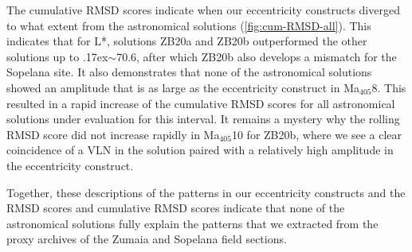 \documentclass[draft]{agujournal2019}
\newcommand{\appr}{\raise.17ex\hbox{\(\scriptstyle\sim\)}} %
\newcommand{\ma}[1]{Ma\(_{405}\)#1} %
\newcommand{\ijk}{\textcolor{blue}}
\begin{document}
The cumulative RMSD scores indicate when our eccentricity constructs diverged to what extent from the astronomical solutions (\cref{fig:cum-RMSD-all}).
This indicates that for \gls{L*}, solutions ZB20a and ZB20b outperformed the other solutions up to \appr\qty{70.6}{\millionyearago}, after which ZB20b also develops a mismatch for the Sopelana site.
It also demonstrates that none of the astronomical solutions showed an amplitude that is as large as the eccentricity construct in \ma{8}.
This resulted in a rapid increase of the cumulative \gls{RMSD} scores for all astronomical solutions under evaluation for this interval.
It remains a mystery why the rolling \gls{RMSD} score did not increase rapidly in \ma{10} for ZB20b, where we see a clear coincidence of a \gls{VLN} in the solution paired with a relatively high amplitude in the eccentricity construct.


Together, these descriptions of the patterns in our eccentricity constructs and the \gls{RMSD} scores and cumulative \gls{RMSD} scores indicate that none of the astronomical solutions fully explain the patterns that we extracted from the proxy archives of the Zumaia and Sopelana field sections.
\end{document}
